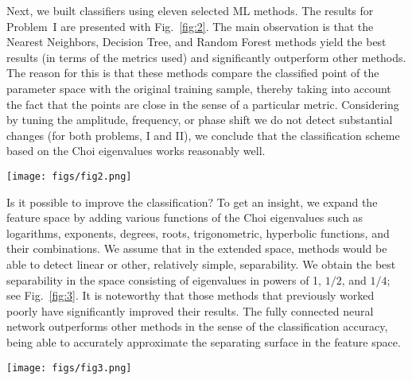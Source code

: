 \documentclass[%
 aip,
 floatfix,
 amsmath,amssymb,
 reprint,%
]{revtex4-1}
\begin{document}
Next, we built classifiers using eleven selected ML methods. The results for Problem~I are presented with Fig.~\ref{fig:2}. The main observation is that the Nearest Neighbors, Decision Tree, and Random Forest methods yield the best results (in terms of the metrics used) and significantly outperform other methods. The reason for this is that  these methods  compare the classified point of the parameter space with the original training sample, thereby taking into account the fact that the points are close in the sense of a particular metric. Considering by tuning the  amplitude, frequency, or phase shift we do not detect substantial changes (for both problems, I and II), we conclude that the classification scheme based on the Choi eigenvalues works reasonably well.

\begin{figure*}[h]
\texttt{[image: figs/fig2.png]}
\caption{Classification accuracy for datasets of Choi eigenvalues of Problem I, for training (top row) and test (bottom row) samples. The accuracy is quantified by using three different measures (see Section VA). The center of a diagram corresponds to accuracy $0.4$.} \label{fig:2}
\end{figure*}

Is it possible to improve the classification? To get an insight, we expand the feature space by adding various functions of the Choi eigenvalues such as logarithms, exponents, degrees, roots, trigonometric, hyperbolic functions, and their combinations. We assume that in the extended space, methods would be able to detect linear or other, relatively simple, separability. We obtain the best separability in the  space consisting of eigenvalues in powers of 1, $1/2$, and $1/4$; see Fig.~\ref{fig:3}. 
It is noteworthy that those methods that previously worked poorly have significantly improved their results. The fully connected neural network outperforms  other methods in the sense  of the classification accuracy, being able to accurately approximate the separating surface in the feature space. 


\begin{figure*}[h]
\texttt{[image: figs/fig3.png]}
\caption{Classification accuracy for datasets of Choi eigenvalues (blue) and of their functions, square roots and and fourth-order roots (red). Datasets were generated for Problem I. The accuracy is quantified by using three different measures (see Section VA). The center of a diagram corresponds to accuracy $0.4$.} \label{fig:3}
\end{figure*}
\end{document}
